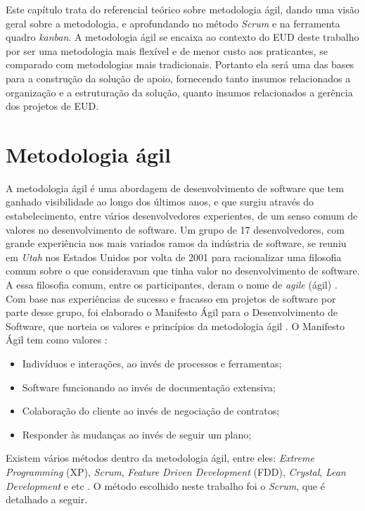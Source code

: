 Este capítulo trata do referencial teórico sobre metodologia ágil, dando uma visão geral sobre a metodologia, e aprofundando no método \textit{Scrum} e na ferramenta quadro \textit{kanban}. A metodologia ágil se encaixa ao contexto do EUD deste trabalho por ser uma metodologia mais flexível e de menor custo aos praticantes, se comparado com metodologias mais tradicionais. Portanto ela será uma das bases para a construção da solução de apoio, fornecendo tanto insumos relacionados a organização e a estruturação da solução, quanto insumos relacionados a gerência dos projetos de EUD.

\section{Metodologia ágil}

A metodologia ágil é uma abordagem de desenvolvimento de software que tem ganhado visibilidade ao longo dos últimos anos, e que surgiu através do estabelecimento, entre vários desenvolvedores experientes, de um senso comum de valores no desenvolvimento de software. Um grupo de 17 desenvolvedores, com grande experiência nos mais variados ramos da indústria de software, se reuniu em \textit{Utah} nos Estados Unidos por volta de 2001 para racionalizar uma filosofia comum sobre o que consideravam que tinha valor no desenvolvimento de software. A essa filosofia comum, entre os participantes, deram o nome de \textit{agile} (ágil) \cite{metodoAgil}. Com base nas experiências de sucesso e fracasso em projetos de software por parte desse grupo, foi elaborado o Manifesto Ágil para o Desenvolvimento de Software, que norteia os valores e princípios da metodologia ágil \cite{metodoAgil}. O Manifesto Ágil tem como valores \cite{metodoAgil}:

\begin{itemize}
\item Indivíduos e interações, ao invés de processos e ferramentas;
\item Software funcionando ao invés de documentação extensiva;
\item Colaboração do cliente ao invés de negociação de contratos;
\item Responder às mudanças ao invés de seguir um plano;
\end{itemize}

Existem vários métodos dentro da metodologia ágil, entre eles: \textit{Extreme Programming} (XP), \textit{Scrum}, \textit{Feature Driven Development} (FDD), \textit{Crystal}, \textit{Lean Development} e etc \cite{agileMethods}. O método escolhido neste trabalho foi o \textit{Scrum}, que é detalhado a seguir.

